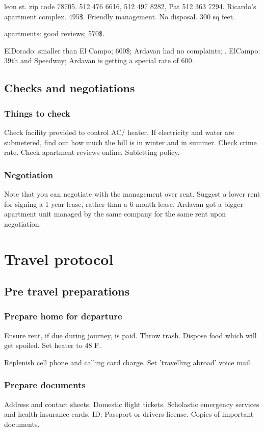 \documentclass[oneside, article]{memoir}
\begin{document}
 leon st. zip code 78705. 512 476 6616, 512 497 8282, Pat 512 363 7294. Ricardo's apartment complex. 495\$. Friendly management. No disposal. 300 sq feet.

 apartments: good reviews; 570\$.

\subitem ElDorado: smaller than El Campo; 600\$; Ardavan had no complaints; . ElCampo: 39th and Speedway; Ardavan is getting a special rate of 600.

\chapter{Checks and negotiations}
\section{Things to check}
\subitem Check facility provided to control AC/ heater. If electricity and water are submetered, find out how much the bill is in winter and in summer.
\subitem Check crime rate. Check apartment reviews online.
\subitem Subletting policy.

\section{Negotiation}
Note that you can negotiate with the management over rent.
\subitem Suggest a lower rent for signing a 1 year lease, rather than a 6 month lease.
\subitem Ardavan got a bigger apartment unit managed by the same company for the same rent upon negotiation.



\part{Travel protocol}
\chapter{Pre travel preparations}
\section{Prepare home for departure}
\subitem Ensure rent, if due during journey, is paid.
\subitem Throw trash.
\subitem Dispose food which will get spoiled.
\subitem Set heater to 48 F.

Replenish cell phone and calling card charge. Set 'travelling abroad' voice mail.

\section{Prepare documents}
\subitem Address and contact sheets.
\subitem Domestic flight tickets.
\subitem Scholastic emergency services and health insurance cards.
\subitem ID: Passport or drivers license.
\subitem Copies of important documents.
\end{document}
